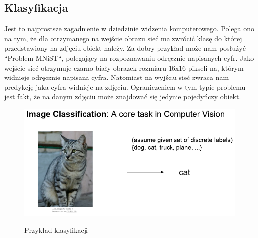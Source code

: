 \documentclass{article}
\begin{document}
\subsection{Klasyfikacja}
Jest to najprostsze zagadnienie w dziedzinie widzenia komputerowego.
Polega ono na tym, że dla otrzymanego na wejście obrazu sieć ma zwrócić klasę do której przedstawiony na zdjęciu obiekt należy.
Za dobry przykład może nam posłużyć ``Problem MNiST``, polegający na rozpoznawaniu odręcznie napisanych cyfr.
Jako wejście sieć otrzymuje czarno-biały obrazek rozmiaru 16x16 pikseli na, którym widnieje odręcznie napisana cyfra.
Natomiast na wyjściu sieć zwraca nam predykcję jaka cyfra widnieje na zdjęciu.
Ograniczeniem w tym typie problemu jest fakt, że na danym zdjęciu może znajdować się jedynie pojedyńczy obiekt.
\begin{figure}[H]
    \centering
    \includegraphics[width=\linewidth]{images/klasyfikacja.png}
    \caption{Przykład klasyfikacji}
    \cite{unet}
    \label{fig:klasyfikacja}
\end{figure}
\end{document}
